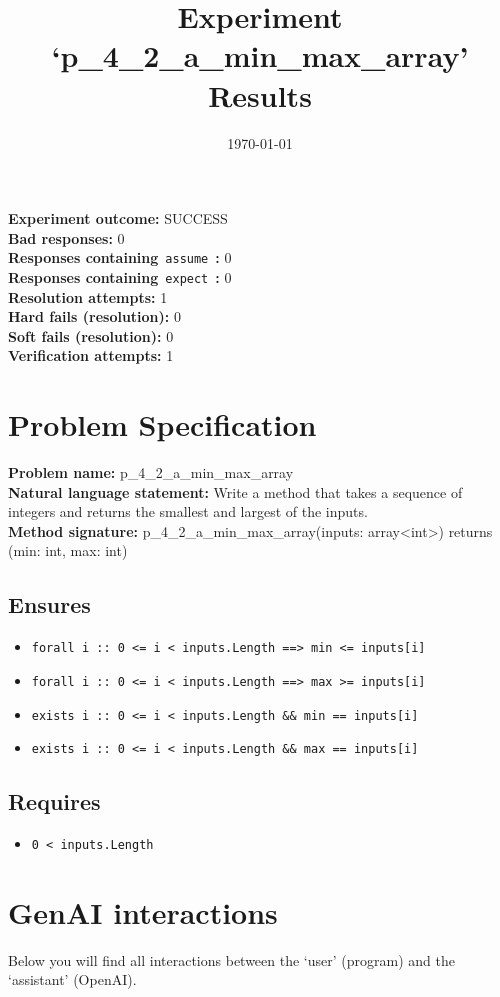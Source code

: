 \documentclass{article}
\begin{document}
\title{Experiment `p\_4\_2\_a\_min\_max\_array' Results}
\author{\today}
\date{}
\maketitle
\textbf{Experiment outcome: }SUCCESS
\\\textbf{Bad responses: }0
\\\textbf{Responses containing}~\texttt{assume}~\textbf{: }0
\\\textbf{Responses containing}~\texttt{expect}~\textbf{: }0
\\\textbf{Resolution attempts: }1
\\\textbf{Hard fails (resolution): }0
\\\textbf{Soft fails (resolution): }0
\\\textbf{Verification attempts: }1
\section*{Problem Specification}
\textbf{Problem name: }p\_4\_2\_a\_min\_max\_array
\\\textbf{Natural language statement: }Write a method that takes a sequence of integers and returns the smallest and largest of the inputs.
\\\textbf{Method signature: }p\_4\_2\_a\_min\_max\_array(inputs: array<int>) returns (min: int, max: int)
\subsection*{Ensures}
\begin{itemize}
\item \texttt{forall i :: 0 <= i < inputs.Length ==> min <= inputs[i]}
\item \texttt{forall i :: 0 <= i < inputs.Length ==> max >= inputs[i]}
\item \texttt{exists i :: 0 <= i < inputs.Length \&\& min == inputs[i]}
\item \texttt{exists i :: 0 <= i < inputs.Length \&\& max == inputs[i]}
\end{itemize}
\subsection*{Requires}
\begin{itemize}
\item \texttt{0 < inputs.Length}
\end{itemize}
\clearpage
\section*{GenAI interactions}
Below you will find all interactions between the `user' (program) and the `assistant' (OpenAI).
\end{document}
